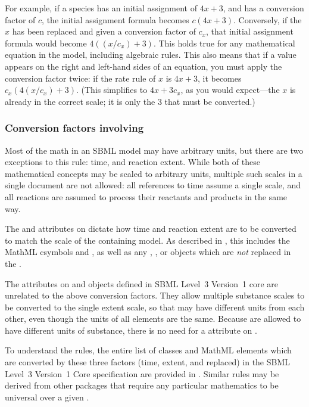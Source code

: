 For example, if a species has an initial assignment of $4x + 3$, and has
a conversion factor of $c$, the initial assignment formula becomes
$c (4x+3)$.  Conversely, if the $x$ has
been replaced and given a conversion factor of $c_x$, that initial
assignment formula would become $4((x/c_x)+3)$.  This holds true for any
mathematical equation in the model, including algebraic rules.  This
also means that if a value appears on the right and left-hand sides of
an equation, you must apply the conversion factor twice: if the rate
rule of $x$ is $4x+3$, it becomes $c_x(4(x/c_x) + 3)$.  (This
simplifies to $4x + 3c_x$, as you would expect---the $x$ is already in
the correct scale; it is only the $3$ that must be converted.)



\subsubsection{Conversion factors involving }

Most of the math in an SBML model may have arbitrary units, but there are
two exceptions to this rule:  time, and reaction extent.  While both of
these mathematical concepts may be scaled to arbitrary units, multiple
such scales in a single document are not allowed:  all references to
time assume a single scale, and all reactions are assumed to process
their reactants and products in the same way.

The  and  attributes 
on \Submodel dictate how time and reaction extent are to be converted to 
match the scale of the containing model.  As described in 
,
this includes the MathML csymbols
 and , as well as any \Delay, \KineticLaw, or
\RateRule objects which are \emph{not} replaced in the \Submodel.

The  attributes on \Species and \Model objects defined
in SBML Level~3 Version~1 core are unrelated to the above conversion factors.  They
allow multiple substance scales to be converted to the single extent scale, so that
\Species may have different units from each other, even though the units of all
\KineticLaw elements are the same.  Because \Species are allowed to have different
units of substance, there is no need for a 
attribute on \Submodel.

To understand the rules, the entire list of classes and MathML elements
which are converted by these three factors (time, extent, and
replaced) in the SBML Level~3 Version~1 Core specification are provided
in .  Similar rules may be derived from other
packages that require any particular mathematics to be universal over 
a given \Model.

